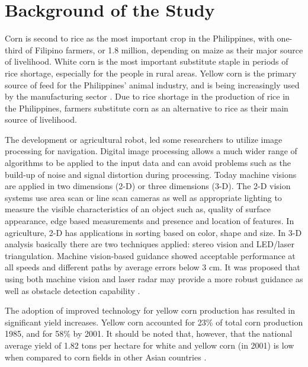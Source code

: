 \section{Background of the Study}

Corn is second to rice as the most important crop in the Philippines, with one-third of Filipino farmers, or 1.8 million, depending on maize as their major source of livelihood. White corn is the most important substitute staple in periods of rice shortage, especially for the people in rural areas. Yellow corn is the primary source of feed for the Philippines’ animal industry, and is being increasingly used by the manufacturing sector \cite{Gerpacio2004}. Due to rice shortage in the production of rice in the Philippines, farmers substitute corn as an alternative to rice as their main source of livelihood.
	
The development or agricultural robot, led some researchers to utilize image processing for navigation. Digital image processing allows a much wider range of algorithms to be applied to the input data and can avoid problems such as the build-up of noise and signal distortion during processing. Today machine visions are applied in two dimensions (2-D) or three dimensions (3-D). The 2-D vision systems use area scan or line scan cameras as well as appropriate lighting to measure the visible characteristics of an object such as, quality of surface appearance, edge based measurements and presence and location of features. In agriculture, 2-D has applications in sorting based on color, shape and size. In 3-D analysis basically there are two techniques applied: stereo vision and LED/laser triangulation. Machine vision-based guidance showed acceptable performance at all speeds and different paths by average errors below 3 cm. It was proposed that using both machine vision and laser radar may provide a more robust guidance as well as obstacle detection capability \cite{Hossein2013}.

	The adoption of improved technology for yellow corn production has resulted in significant yield increases.  Yellow corn accounted for 23\% of total corn production 1985, and for 58\% by 2001. It should be noted that, however, that the national average yield of 1.82 tons per hectare for white and yellow corn (in 2001) is low when compared to corn fields in other Asian countries \cite{Gerpacio2004}.

